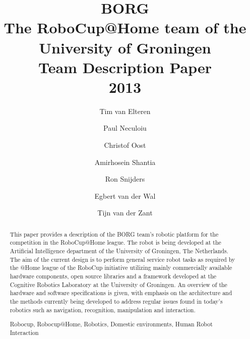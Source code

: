 \documentclass[runningheads,a4paper]{llncs}
\newcommand{\keywords}[1]{\par\addvspace\baselineskip
\noindent\keywordname\enspace\ignorespaces#1}
\begin{document}
\mainmatter  %

\title{\huge{BORG} \\ \small{The RoboCup@Home team of the University of Groningen} \\ \large{Team Description Paper} \\ 2013}


\author{    
    Tim van Elteren \and
    Paul Neculoiu \and
    Christof Oost \and
    Amirhosein Shantia \and
    Ron Snijders \and
    Egbert van der Wal \and
    Tijn van der Zant
}
%


%
%

\maketitle

\begin{abstract}
This paper provides a description of the BORG team's robotic platform for the competition in the RoboCup@Home league. 
The robot is being developed at the Artificial Intelligence department of the University of Groningen, The Netherlands. 
The aim of the current design is to perform general service robot tasks as required by the @Home league of the RoboCup initiative utilizing mainly commercially available hardware components, open source libraries and a framework developed at the Cognitive Robotics Laboratory at the University of Groningen. 
An overview of the hardware and software specifications is given, with emphasis on the architecture and the methods currently being developed to address regular issues found in today's robotics such as navigation, recognition, manipulation and interaction.

\keywords{Robocup, Robocup@Home, Robotics, Domestic environments, Human Robot Interaction}
\end{abstract}
\end{document}
